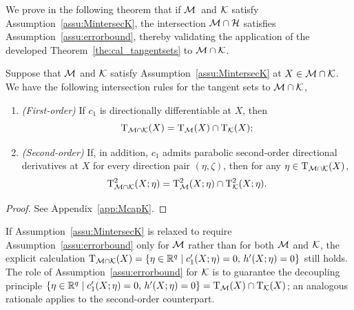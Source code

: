 We prove in the following theorem that if $\mathcal{M}$\ and $\mathcal{K}$ satisfy Assumption~\ref{assu:MintersecK}, the intersection $\mathcal{M}\cap\mathcal{H}$ satisfies Assumption~\ref{assu:errorbound}, thereby validating the application of the developed Theorem~\ref{the:cal_tangentsets} to $\mathcal{M}\cap\mathcal{K}$.

\begin{theorem}\label{the:expressions_McapK}
    Suppose that $\mathcal{M}$ and $\mathcal{K}$ satisfy Assumption~\ref{assu:MintersecK} at $X\in\mathcal{M}\cap\mathcal{K}$. We have the following intersection rules for the tangent sets to $\mathcal{M}\cap\mathcal{K}$,
    \begin{enumerate}
    \item[\emph{(i)}] \emph{(First-order)} If $c_1$ is directionally differentiable at $X$, then
    \begin{equation}\label{eq:decoupletangentMK}
        \mathrm{T}_{\mathcal{M}\cap\mathcal{K}}(X) = \mathrm{T}_{\mathcal{M}}(X)\cap\mathrm{T}_{\mathcal{K}}(X);
    \end{equation}
    \item[\emph{(ii)}] \emph{(Second-order)} If, in addition, $c_1$ admits parabolic second-order directional derivatives at $X$ for every direction pair $(\eta,\zeta)$, then for any $\eta\in\mathrm{T}_{\mathcal{M}\cap\mathcal{K}}(X)$,
    \begin{equation}\label{eq:decoupletangenttwoMK}
        \mathrm{T}^2_{\mathcal{M}\cap\mathcal{K}}(X;\eta) = \mathrm{T}^2_{\mathcal{M}}(X;\eta)\cap\mathrm{T}^2_{\mathcal{K}}(X;\eta).
    \end{equation}
    \end{enumerate}
\end{theorem}
\begin{proof}
    See Appendix~\ref{app:McapK}.
\end{proof}

\begin{remark}
    If Assumption~\ref{assu:MintersecK} is relaxed to require Assumption~\ref{assu:errorbound} only for $\mathcal{M}$ rather than for both $\mathcal{M}$ and $\mathcal{K}$, the explicit calculation $\mathrm{T}_{\mathcal{M}\cap\mathcal{K}}(X) = \{\eta\in\mathbb{R}^q\mid c_1^\prime(X;\eta)=0,\,h^\prime(X;\eta)=0\}$ still holds. The role of Assumption~\ref{assu:errorbound} for $\mathcal{K}$ is to guarantee the decoupling principle $\{\eta\in\mathbb{R}^q\mid c_1^\prime(X;\eta)=0,\,h^\prime(X;\eta)=0\}=\mathrm{T}_{\mathcal{M}}(X)\cap\mathrm{T}_{\mathcal{K}}(X)$; an analogous rationale applies to the second-order counterpart.
\end{remark}



